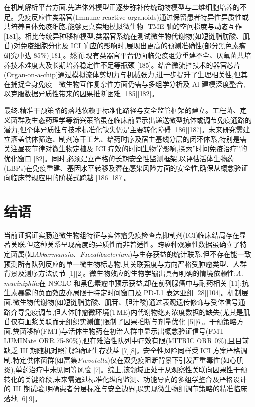 在机制解析平台方面,先进体外模型正逐步弥补传统动物模型与二维细胞培养的不足。免疫反应性类器官(Immune-reactive organoids)通过保留患者特异性异质性或共培养自体免疫细胞,能够更真实地模拟微生物 -TME 轴的空间梯度与动态互作 {[}181{]}。相比传统异种移植模型,类器官系统在测试微生物代谢物(如短链脂肪酸、肌苷)对免疫细胞分化及 ICI 响应的影响时,展现出更高的预测准确性(部分黑色素瘤研究中达 85\%){[}181{]}。然而,现有类器官平台仍面临免疫组分重建不全、厌氧菌共培养技术难度大及长期培养稳定性不足等瓶颈 {[}185{]}。结合微流控技术的器官芯片(Organ-on-a-chip)通过模拟流体剪切力与机械张力,进一步提升了生理相关性,但其在捕捉全身免疫 - 微生物互作复杂性方面仍需与多组学分析及 AI 建模深度整合,以克服数据异质性带来的因果推断困难 {[}185{]}{[}182{]}。

最终,精准干预策略的落地依赖于标准化路径与安全监管框架的建立。工程菌、定义菌群及生态药理学等新兴策略虽在临床前显示出递送微型抗体或调节免疫通路的潜力,但个体异质性与技术标准化缺失仍是主要转化障碍 {[}186{]}{[}187{]}。未来研究需建立涵盖供体筛选、制剂冻干工艺、给药时序及宿主基线分层的闭环体系,特别是需关注昼夜节律对微生物定植及 ICI 疗效的时间生物学影响,探索''时间免疫治疗''的优化窗口 {[}82{]}。同时,必须建立严格的长期安全性监测框架,以评估活体生物药(LBPs)在免疫重建、基因水平转移及潜在感染风险方面的安全性,确保从概念验证向临床常规应用的阶梯式跨越 {[}186{]}{[}187{]}。

\section{结语}\label{ux7ed3ux8bed}

当前证据证实肠道微生物组特征与实体瘤免疫检查点抑制剂(ICI)临床结局存在显著关联,但这种关系呈现高度的异质性而非普适性。跨癌种观察性数据虽确立了特定菌属(如\emph{Akkermansia}、\emph{Faecalibacterium})与生存获益的统计联系,但不存在能一致预测所有队列反应的单一微生物标志物,其关联强度与方向严格受肿瘤类型、人群背景及测序方法调节 {[}1{]}{[}2{]}。微生物效应的生物学输出具有明确的情境依赖性:\emph{A. muciniphila}在 NSCLC 和黑色素瘤中预示获益,却在前列腺癌中与耐药相关 {[}11{]};抗生素暴露的负面效应亦局限于特定时间窗口及 PD-L1 表达亚组 {[}28{]}{[}104{]}。机制层面,微生物代谢物(如短链脂肪酸、肌苷、胆汁酸)通过表观遗传修饰与受体信号通路介导免疫调节,但人体肿瘤微环境(TME)内代谢物绝对浓度数据的缺失(尤其是肌苷仅有血浆关联而无组织实测值)限制了因果推断与剂量优化 {[}5{]}{[}6{]}。干预策略方面,粪菌移植(FMT)与活体生物药在初治人群中显示出概念验证信号(FMT-LUMINate ORR 75-80\%),但在难治性队列中疗效有限(MITRIC ORR 0\%),且目前缺乏 III 期随机对照试验确证生存获益 {[}7{]}{[}8{]}。安全性风险同样受 ICI 方案严格调制,特定供体菌群(如富集\emph{Prevotella})仅在双免疫阻断背景下引发严重毒性(如心肌炎),单药治疗中未见同等风险 {[}7{]}。综上,该领域正处于从观察性关联向因果性干预转化的关键阶段,未来需通过标准化纵向监测、功能导向的多组学整合及严格设计的 III 期试验,明确患者分层标准与安全边界,以实现微生物组调节策略的精准临床落地 {[}6{]}{[}9{]}。

